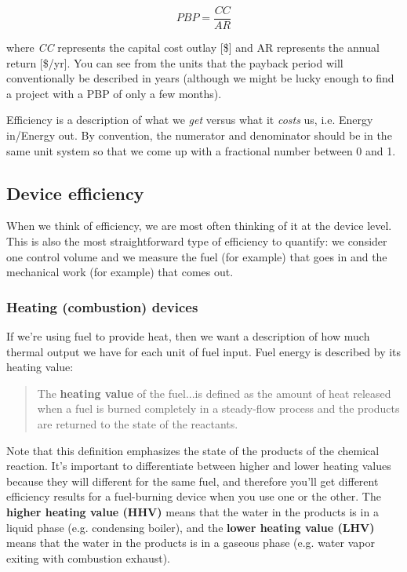 \documentclass[10pt]{article}
\begin{document}
\begin{equation}
\label{pbp}
PBP = \frac{CC}{AR}
\end{equation}

where \textit{CC} represents the capital cost outlay [\$] and AR represents the annual return [\$/yr]. You can see from the units that the payback period will conventionally be described in years (although  we might be lucky enough to find a project with a PBP of only a few months).

Efficiency is a description of what we \textit{get} versus what it \textit{costs} us, i.e. Energy in/Energy out. By convention, the numerator and denominator should be in the same unit system so that we come up with a fractional number between 0 and 1.

\subsection{Device efficiency}

When we think of efficiency, we are most often thinking of it at the device level. This is also the most straightforward type of efficiency to quantify: we consider one control volume and we measure the fuel (for example) that goes in and the mechanical work (for example) that comes out.

\subsubsection{Heating (combustion) devices}

If we're using fuel to provide heat, then we want a description of how much thermal output we have for each unit of fuel input. Fuel energy is described by its heating value:

\begin{quote}
    The \textbf{heating value} of the fuel...is defined as the amount of heat released when a fuel is burned completely in a steady-flow process and the products are returned to the state of the reactants. \cite{cengel}
\end{quote}

Note that this definition emphasizes the state of the products of the chemical reaction. It's important to differentiate between higher and lower heating values because they will different for the same fuel, and therefore you'll get different efficiency results for a fuel-burning device when you use one or the other. The \textbf{higher heating value (HHV)} means that the water in the products is in a liquid phase (e.g. condensing boiler), and the \textbf{lower heating value (LHV)} means that the water in the products is in a gaseous phase (e.g. water vapor exiting with combustion exhaust).
\end{document}
